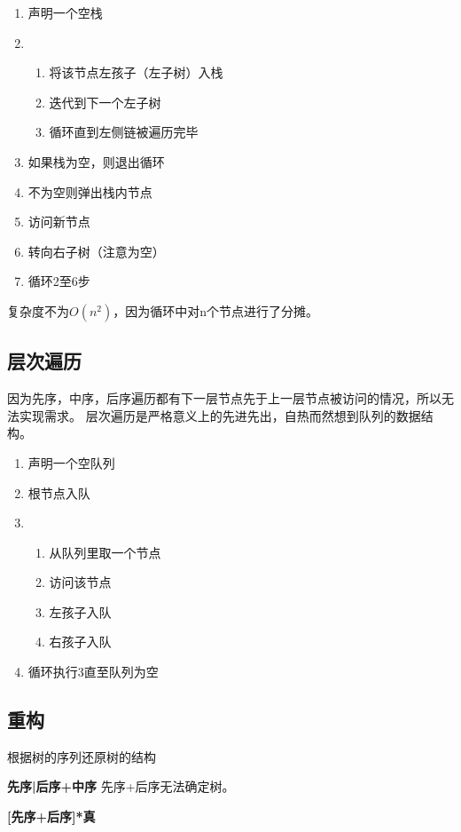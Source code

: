 \documentclass{article}
\begin{document}
\begin{enumerate}
  \item 声明一个空栈
  \item \begin{enumerate}
          \item 将该节点左孩子（左子树）入栈
          \item 迭代到下一个左子树
          \item 循环直到左侧链被遍历完毕
        \end{enumerate}
  \item 如果栈为空，则退出循环
  \item 不为空则弹出栈内节点
  \item 访问新节点
  \item 转向右子树（注意为空）
  \item 循环2至6步
\end{enumerate}

复杂度不为$O(n^2)$，因为循环中对n个节点进行了分摊。

\subsection{层次遍历}
因为先序，中序，后序遍历都有下一层节点先于上一层节点被访问的情况，所以无法实现需求。
层次遍历是严格意义上的先进先出，自热而然想到队列的数据结构。

\begin{enumerate}
  \item 声明一个空队列
  \item 根节点入队
  \item \begin{enumerate}
          \item 从队列里取一个节点
          \item 访问该节点
          \item 左孩子入队
          \item 右孩子入队
        \end{enumerate}
  \item 循环执行3直至队列为空
\end{enumerate}

\subsection{重构}
根据树的序列还原树的结构

\textbf{先序|后序+中序}
先序+后序无法确定树。

\textbf{[先序+后序]*真}
\end{document}
